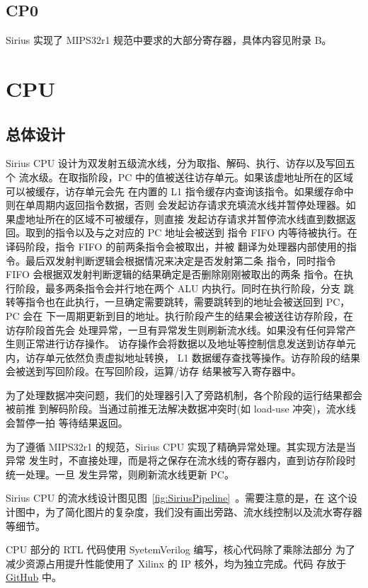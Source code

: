 \documentclass[blue,normal,cn,hide]{elegantbook}
\begin{document}
\section{CP0}

Sirius 实现了 MIPS32r1 规范中要求的大部分寄存器，具体内容见附录 B。

\chapter{CPU}

\section{总体设计}

Sirius CPU 设计为双发射五级流水线，分为取指、解码、执行、访存以及写回五个
流水级。在取指阶段，PC 中的值被送往访存单元。如果该虚地址所在的区域可以被缓存，访存单元会先
在内置的 L1 指令缓存内查询该指令。如果缓存命中则在单周期内返回指令数据，否则
会发起访存请求充填流水线并暂停处理器。如果虚地址所在的区域不可被缓存，则直接
发起访存请求并暂停流水线直到数据返回。取到的指令以及与之对应的 PC 地址会被送到
指令 FIFO 内等待被执行。在译码阶段，指令 FIFO 的前两条指令会被取出，并被
翻译为处理器内部使用的指令。最后双发射判断逻辑会根据情况来决定是否发射第二条
指令，同时指令 FIFO 会根据双发射判断逻辑的结果确定是否删除刚刚被取出的两条
指令。在执行阶段，最多两条指令会并行地在两个 ALU 内执行。同时在执行阶段，分支
跳转等指令也在此执行，一旦确定需要跳转，需要跳转到的地址会被送回到 PC，PC 会在
下一周期更新到目的地址。执行阶段产生的结果会被送往访存阶段，在访存阶段首先会
处理异常，一旦有异常发生则刷新流水线。如果没有任何异常产生则正常进行访存操作。
访存操作会将数据以及地址等控制信息发送到访存单元内，访存单元依然负责虚拟地址转换，
L1 数据缓存查找等操作。访存阶段的结果会被送到写回阶段。在写回阶段，运算/访存
结果被写入寄存器中。

为了处理数据冲突问题，我们的处理器引入了旁路机制，各个阶段的运行结果都会被前推
到解码阶段。当通过前推无法解决数据冲突时(如 load-use 冲突)，流水线会暂停一拍
等待结果返回。

为了遵循 MIPS32r1 的规范，Sirius CPU 实现了精确异常处理。其实现方法是当异常
发生时，不直接处理，而是将之保存在流水线的寄存器内，直到访存阶段时统一处理。一旦
发生异常，则刷新流水线更新 PC。

Sirius CPU 的流水线设计图见图~\ref{fig:SiriusPipeline}~。需要注意的是，在
这个设计图中，为了简化图片的复杂度，我们没有画出旁路、流水线控制以及流水寄存器
等细节。

CPU 部分的 RTL 代码使用 SyetemVerilog 编写，核心代码除了乘除法部分
为了减少资源占用提升性能使用了 Xilinx 的 IP 核外，均为独立完成。代码
存放于 \href{https://github.com/name1e5s/Sirius}{GitHub} 中。
\end{document}
